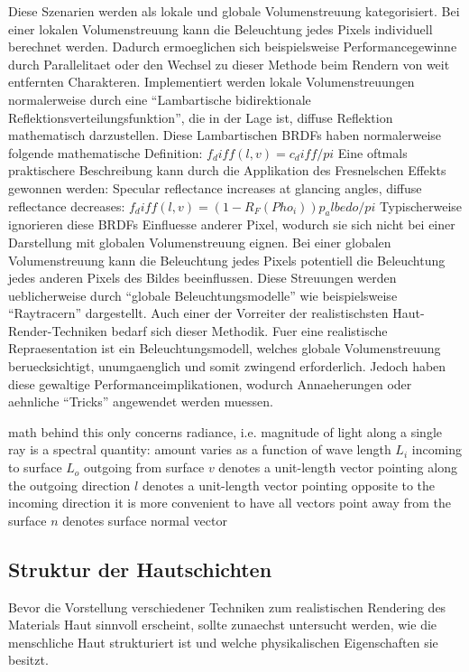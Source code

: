 \documentclass[ngerman,runningheads,a4paper]{llncs}[2018/03/10]
\begin{document}
Diese Szenarien werden als lokale und globale Volumenstreuung kategorisiert.
Bei einer lokalen Volumenstreuung kann die Beleuchtung jedes Pixels individuell berechnet werden.
Dadurch ermoeglichen sich beispielsweise Performancegewinne durch Parallelitaet oder den Wechsel zu dieser Methode beim Rendern von weit entfernten Charakteren.
Implementiert werden lokale Volumenstreuungen normalerweise durch eine \enquote{Lambartische bidirektionale Reflektionsverteilungsfunktion}, die in der Lage ist, diffuse Reflektion mathematisch darzustellen. Diese Lambartischen BRDFs haben normalerweise folgende mathematische Definition: $f_diff(l, v) = c_diff / pi$
Eine oftmals praktischere Beschreibung kann durch die Applikation des Fresnelschen Effekts gewonnen werden: Specular reflectance increases at glancing angles, diffuse reflectance decreases: $f_diff(l, v) = (1 - R_F(Pho_i))  p_albedo/pi$
Typischerweise ignorieren diese BRDFs Einfluesse anderer Pixel, wodurch sie sich nicht bei einer Darstellung mit globalen Volumenstreuung eignen.
Bei einer globalen Volumenstreuung kann die Beleuchtung jedes Pixels potentiell die Beleuchtung jedes anderen Pixels des Bildes beeinflussen.
Diese Streuungen werden ueblicherweise durch \enquote{globale Beleuchtungsmodelle} wie beispielsweise \enquote{Raytracern} dargestellt.
Auch einer der Vorreiter der realistischsten Haut-Render-Techniken \citet{spectral-bssrdf-human-skin} bedarf sich dieser Methodik.
Fuer eine realistische Repraesentation ist ein Beleuchtungsmodell, welches globale Volumenstreuung beruecksichtigt, unumgaenglich und somit zwingend erforderlich.
Jedoch haben diese gewaltige Performanceimplikationen, wodurch Annaeherungen oder aehnliche \enquote{Tricks} angewendet werden muessen.

     math behind this only concerns radiance, i.e. magnitude of light along a single ray
       is a spectral quantity: amount varies as a function of wave length
       $L_i$ incoming to surface
       $L_o$ outgoing from surface
       $v$ denotes a unit-length vector pointing along the outgoing direction
       $l$ denotes a unit-length vector pointing opposite to the incoming direction
         it is more convenient to have all vectors point away from the surface
       $n$ denotes surface normal vector

\subsection{Struktur der Hautschichten}

Bevor die Vorstellung verschiedener Techniken zum realistischen Rendering des Materials Haut sinnvoll erscheint, sollte zunaechst untersucht werden, wie die menschliche Haut strukturiert ist und welche physikalischen Eigenschaften sie besitzt.
\end{document}
